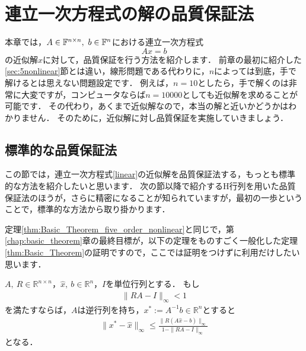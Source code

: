\chapter{連立一次方程式の解の品質保証法} \label{chap:linear_eq}
本章では，$A\in\F^{n\times n},\ b\in\F^n$における連立一次方程式
\begin{equation}
	Ax=b \label{linear}
\end{equation}
の近似解$\hat{x}$に対して，品質保証を行う方法を紹介します．
前章の最初に紹介した\ref{sec:5nonlinear}節とは違い，線形問題である代わりに，$n$によっては到底，手で解けるとは思えない問題設定です．
例えば，$n = 10$としたら，手で解くのは非常に大変ですが，コンピュータならば$n = 10000$としても近似解を求めることが可能です．
その代わり，あくまで近似解なので，本当の解と近いかどうかはわかりません．
そのために，近似解に対し品質保証を実施していきましょう．



\section{標準的な品質保証法}\label{sec:basic_linear_problem}
この節では，連立一次方程式\eqref{linear}の近似解を品質保証法する，もっとも標準的な方法を紹介したいと思います．
次の節以降で紹介するH行列を用いた品質保証法のほうが，さらに精密になることが知られていますが，最初の一歩ということで，標準的な方法から取り掛かります．

定理\ref{thm:Basic_Theorem_five_order_nonlinear}と同じで，第\ref{chap:basic_theorem}章の最終目標が，以下の定理をものすごく一般化した定理\ref{thm:Basic_Theorem}の証明ですので，ここでは証明をつけずに利用だけしたい思います．

\begin{Thm}\label{thm:basic_linear_problem}
	$A,\ R\in {\mathbb R}^{n\times n}$，$\hat{x},\ b\in {\mathbb R}^n$，$I$を単位行列とする．
	もし
	\begin{align}
		\label{cond:RAminusI}
		\| RA - I  \|_{\infty} < 1
	\end{align}
	を満たすならば，$A$は逆行列を持ち，$x^* := A^{-1}b \in {\mathbb R}^n$とすると
	\begin{align}
		\label{linear_prpblem_err}
		\| x^* - \hat{x} \|_{\infty} \leq \frac{ \|R(A\hat{x}-b)\|_{\infty} }{ 1-\|RA-I\|_{\infty} }
	\end{align}
	となる．
\end{Thm}

